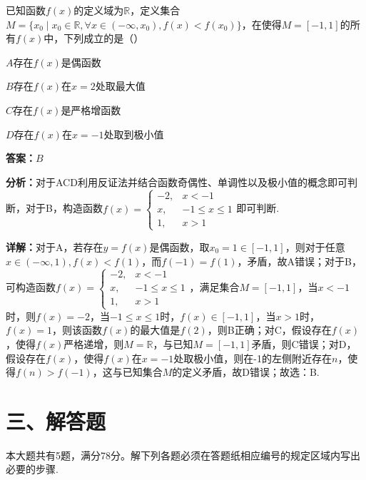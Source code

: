 \begin{question}[points=5]
已知函数$f(x)$的定义域为$\mathbb{R}$，定义集合$M=\{x_0\mid x_0\in\mathbb{R},\forall x\in(-\infty,x_0),f(x)<f(x_0)\}$，在使得$M=[-1,1]$的所有$f(x)$中，下列成立的是（\quad\quad）
\begin{choices}
  \item $A$存在$f(x)$是偶函数
  \item $B$存在$f(x)$在$x=2$处取最大值
  \item $C$存在$f(x)$是严格增函数
  \item $D$存在$f(x)$在$x=-1$处取到极小值
\end{choices}
\begin{solution}
\textbf{答案：}$B$

\textbf{分析：}对于ACD利用反证法并结合函数奇偶性、单调性以及极小值的概念即可判断，对于B，构造函数$f(x)=\begin{cases} -2, & x<-1 \\ x, & -1\le x\le1 \\ 1, & x>1 \end{cases}$即可判断.

\textbf{详解：}对于A，若存在$y=f(x)$是偶函数，取$x_0=1\in[-1,1]$，则对于任意$x\in(-\infty,1),f(x)<f(1)$，而$f(-1)=f(1)$，矛盾，故A错误；对于B，可构造函数$f(x)=\begin{cases} -2, & x<-1 \\ x, & -1\le x\le1 \\ 1, & x>1 \end{cases}$，满足集合$M=[-1,1]$，当$x<-1$时，则$f(x)=-2$，当$-1\le x\le1$时，$f(x)\in[-1,1]$，当$x>1$时，$f(x)=1$，则该函数$f(x)$的最大值是$f(2)$，则B正确；对C，假设存在$f(x)$，使得$f(x)$严格递增，则$M=\mathbb{R}$，与已知$M=[-1,1]$矛盾，则C错误；对D，假设存在$f(x)$，使得$f(x)$在$x=-1$处取极小值，则在-1的左侧附近存在$n$，使得$f(n)>f(-1)$，这与已知集合$M$的定义矛盾，故D错误；故选：B.
\end{solution}
\end{question}

\section*{三、解答题}
本大题共有5题，满分78分。解下列各题必须在答题纸相应编号的规定区域内写出必要的步骤.

